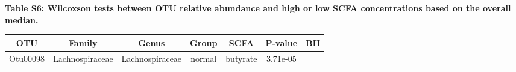 \documentclass[11pt,]{article}
\begin{document}
\normalsize

\newpage

\textbf{Table S6: Wilcoxson tests between OTU relative abundance and
high or low SCFA concentrations based on the overall median.}

\scriptsize

\begin{longtable}[]{@{}ccccccc@{}}
\toprule
\begin{minipage}[b]{0.09\columnwidth}\centering\strut
OTU\strut
\end{minipage} & \begin{minipage}[b]{0.17\columnwidth}\centering\strut
Family\strut
\end{minipage} & \begin{minipage}[b]{0.17\columnwidth}\centering\strut
Genus\strut
\end{minipage} & \begin{minipage}[b]{0.09\columnwidth}\centering\strut
Group\strut
\end{minipage} & \begin{minipage}[b]{0.11\columnwidth}\centering\strut
SCFA\strut
\end{minipage} & \begin{minipage}[b]{0.09\columnwidth}\centering\strut
P-value\strut
\end{minipage} & \begin{minipage}[b]{0.09\columnwidth}\centering\strut
BH\strut
\end{minipage}\tabularnewline
\midrule
\endhead
\begin{minipage}[t]{0.09\columnwidth}\centering\strut
Otu00098\strut
\end{minipage} & \begin{minipage}[t]{0.17\columnwidth}\centering\strut
Lachnospiraceae\strut
\end{minipage} & \begin{minipage}[t]{0.17\columnwidth}\centering\strut
Lachnospiraceae\strut
\end{minipage} & \begin{minipage}[t]{0.09\columnwidth}\centering\strut
normal\strut
\end{minipage} & \begin{minipage}[t]{0.11\columnwidth}\centering\strut
butyrate\strut
\end{minipage} & \begin{minipage}[t]{0.09\columnwidth}\centering\strut
3.71e-05\strut
\end{minipage} & \begin{minipage}[t]{0.09\columnwidth}\centering\strut

\end{minipage}
\end{longtable}
\end{document}
